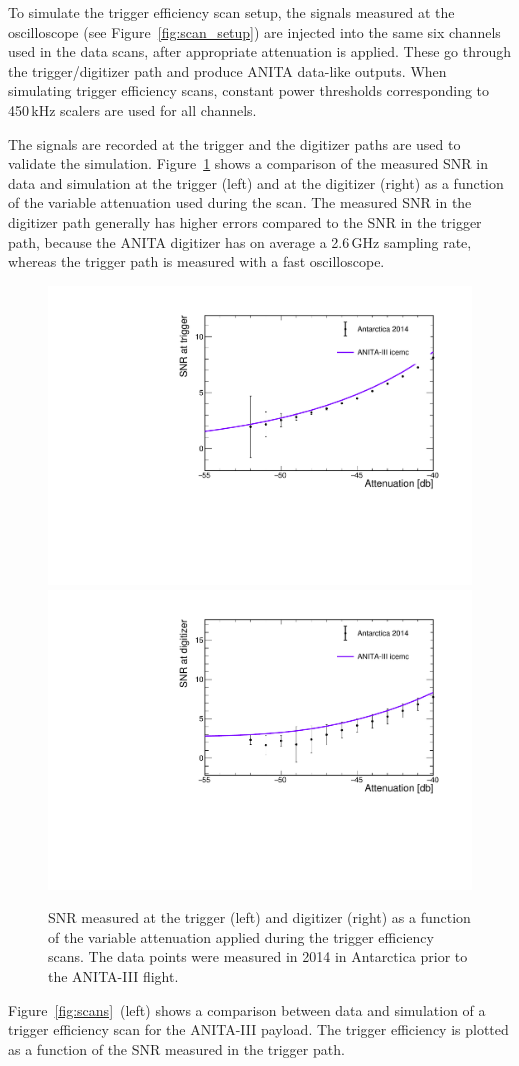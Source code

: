 To simulate the trigger efficiency scan setup, the signals
measured at the oscilloscope (see Figure~\ref{fig:scan_setup}) are
injected into the same six channels used in the data scans, after
appropriate attenuation is applied.
These go through the trigger/digitizer path and produce ANITA
data-like outputs.
When simulating trigger efficiency scans, constant power
thresholds corresponding to 450\,kHz scalers are used for all channels.

The signals are recorded at the trigger and the digitizer paths
are used to validate the simulation.
Figure~\ref{fig:scan_snr} shows a comparison of the measured SNR in
data and simulation at the trigger (left) and at
the digitizer (right) as a function of the variable attenuation used
during the scan.
The measured SNR in the digitizer path generally has higher errors compared to the SNR in the trigger path, because the ANITA digitizer has on average a
2.6\,GHz sampling rate, whereas the trigger path is measured with a
fast oscilloscope. 

\begin{figure}[!h]\centering
  \includegraphics[width=.45\linewidth]{./Figs/EfficiencyScanNoDelaysA3_snrTriggerVSattenuation.pdf} 
  \includegraphics[width=.45\linewidth]{./Figs/EfficiencyScanNoDelaysA3_snrDigitizerVSattenuation.pdf}
  \caption{SNR measured at the trigger (left) and digitizer (right) as
  a function of the variable attenuation applied during the trigger
  efficiency scans. The data points were measured in 2014 in Antarctica prior to the
  ANITA-III flight.
}
  \label{fig:scan_snr}
\end{figure}

Figure~\ref{fig:scans}~(left) shows a comparison between data and simulation of a trigger efficiency scan for the ANITA-III payload.
The trigger efficiency is plotted as a function of the SNR
measured in the trigger path.

